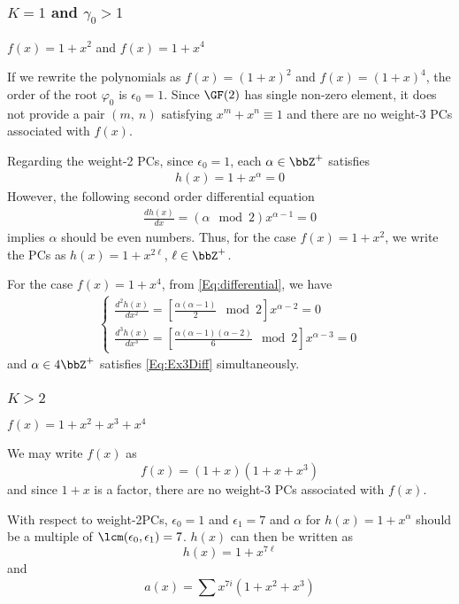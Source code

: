 \subsubsection{$K=1$ and $\gamma_0 > 1$}
\begin{example}
	$f(x)=1+x^2$ and $f(x)=1+x^4$\newline
	
	If we rewrite the polynomials as $f(x)=(1+x)^2$ and $f(x)=(1+x)^4$,	the order of the root $\varphi_0$ is $\epsilon_0=1$. Since $\GF(2)$ has single non-zero element, it does not provide a pair $(m,~n)$ satisfying $x^m+x^n \equiv 1$ and there are no weight-3 PCs associated with $f(x)$.
	
	Regarding the weight-2 PCs, since $\epsilon_0 = 1$, each $\alpha \in \bbZ^+$ satisfies
	\begin{align}
		h(x) = 1+x^\alpha = 0
	\end{align}
	However, the following second order differential equation
	\begin{align}
	\frac{dh(x)}{dx} = (\alpha\mod 2) x^{\alpha-1} = 0
	\end{align}
	implies $\alpha$ should be even numbers. Thus, for the case $f(x) = 1+x^2$, we write the PCs as  $h(x)=1+x^{2\ell}$, $\ell \in \bbZ^+$.
	

	For the case $f(x) = 1+x^4$, from \eqref{Eq:differential}, we have
	\begin{align}
		\begin{cases}
		\frac{d^2h(x)}{dx^2} = \left[\frac{\alpha(\alpha-1)}{2} \mod 2\right]x^{\alpha-2} = 0 \\
		\frac{d^3h(x)}{dx^3} = \left[\frac{\alpha(\alpha-1)(\alpha-2)}{6} \mod 2\right]x^{\alpha-3} = 0
		\end{cases}
		\label{Eq:Ex3Diff}
	\end{align}
	and $\alpha \in 4\bbZ^+$ satisfies \eqref{Eq:Ex3Diff} simultaneously.
\label{Ex:4}
\end{example}

\subsubsection{$K>2$}

\begin{example}
	$f(x)=1+x^2+x^3+x^4$\newline
	
	We may write $f(x)$ as 
	$$f(x) =(1+x)(1+x+x^3)$$
	and since $1+x$ is a factor, there are no weight-3 PCs associated with $f(x)$.
	
	With respect to weight-2PCs, $\epsilon_0=1$ and $\epsilon_1=7$ and $\alpha$ for $h(x)=1+x^{\alpha}$ should be a multiple of $\lcm(\epsilon_0,\epsilon_1)=7$. $h(x)$ can then be written as 
	$$h(x) =1+x^{7\ell}$$ and 
	$$a(x) = \sum_{}^{}x^{7i}(1+x^2+x^3)$$
	\label{Ex:5}	
\end{example}

